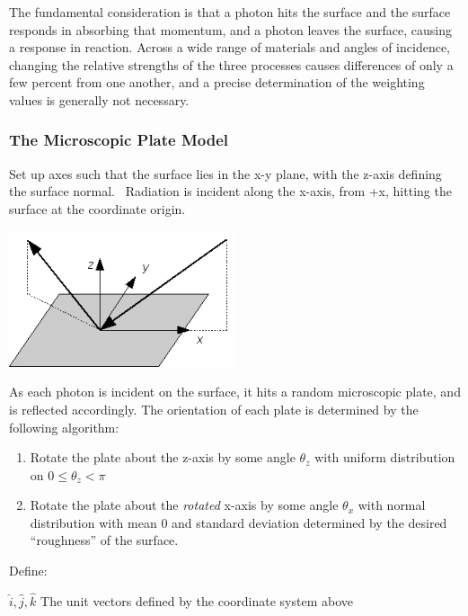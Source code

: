       The fundamental consideration is that a photon hits the surface
      and the surface responds in absorbing that momentum, and a photon
      leaves the surface, causing a response in reaction.  Across a
      wide range of materials and angles of incidence, changing the
      relative strengths of the three processes causes differences of only
      a few percent from one another, and a precise determination of the
      weighting values is generally not necessary.

      \subsubsection{The Microscopic Plate Model}\bigskip

        Set up axes such that the surface lies in the x{}-y plane, with the
        z{}-axis defining the surface normal. \ Radiation is incident along the
        x{}-axis, from +x, hitting the surface at the coordinate origin.

        \includegraphics[height=40mm]{figs/sda/4_sda.jpg}

        As each photon is incident on the surface, it hits a random microscopic
        plate, and is reflected accordingly. The orientation of each plate is
        determined by the following algorithm:

        \begin{enumerate}
        \item Rotate the plate about the z{}-axis by some angle  $\theta _{z}$
        with uniform distribution on  $0\leqslant \theta _{z}<\pi $
        \item Rotate the plate about the \textit{rotated} x{}-axis by
        some angle $\theta _{x}$ with normal distribution
        with mean 0 and standard deviation determined by the desired
        ``roughness'' of the surface.
        \end{enumerate}

        Define:

         $\hat{i},\hat{j},\hat{k}$ The unit vectors defined by
        the coordinate system above

